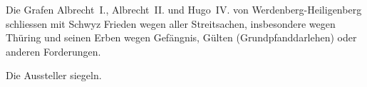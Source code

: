 \documentclass[10pt,twoside]{article}
\begin{document}
\def\volume{XIV. Abteilung: Die Rechtsquellen des Kantons St. Gallen, Dritter Teil: Die Landschaften und Landstädte, Band 4: Die Rechtsquellen der
     Region Werdenberg: Grafschaft Werdenberg und Herrschaft Wartau, Freiherrschaft Sax-Forstegg und Herrschaft Hohensax-Gams von \persname{}{Sibylle Malamud}, 2019.}
\def\volid{\url{https://www.ssrq-sds-fds.ch/online/tei/SG/SSRQ_SG_III_4_010.xml}}
\linenumbers				%
\normalsize					%
\thispagestyle{firstpage}
\sloppy
\setcounter{subsection}{9}  %
\fussy
{}
\begin{summary}

                     Die Grafen Albrecht~I., Albrecht~II. und Hugo~IV. von Werdenberg-Heiligenberg schliessen mit Schwyz Frieden wegen aller Streitsachen, insbesondere wegen Thüring und seinen Erben wegen Gefängnis, Gülten (Grundpfanddarlehen) oder anderen Forderungen.

Die Aussteller siegeln.
\end{summary}
\end{document}
